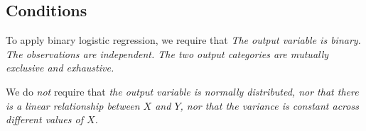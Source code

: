 %
%

%


\subsection{Conditions}
\vspace*{2ex}
To apply binary logistic regression, we require that 
\bit
\it The output variable is binary.
\it The observations are independent.
\it The two output categories are mutually exclusive and exhaustive.
\eit

\vspace*{2ex}
We do \emph{not} require that
\bit
\it the output variable is normally distributed, nor that
\it there is a linear relationship between $X$ and $Y$, nor that
\it the variance is constant across different values of $X$.
\eit


